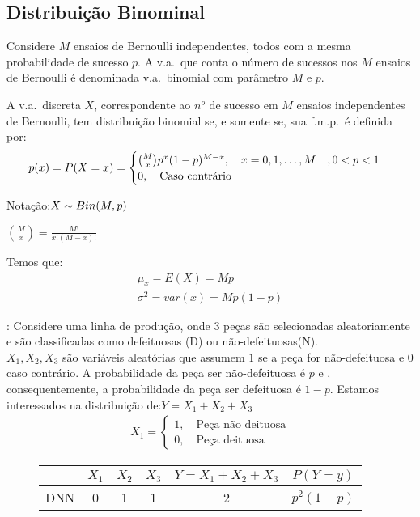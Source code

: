  \subsection{Distribuição Binominal}

 \begin{description}
   \item  Considere $M$ ensaios de Bernoulli independentes, todos com a mesma probabilidade
 de sucesso $p$. A v.a.\ que conta o número de sucessos nos $M$ ensaios de Bernoulli
 é denominada v.a.\ binomial com parâmetro $M$ e $p$.

   \item[Definição:] A v.a.\ discreta $X$, correspondente ao $n^o$ de sucesso em $M$ ensaios
     independentes de Bernoulli, tem distribuição binomial se, e somente se, sua 
     f.m.p.\ é definida por: 
     \begin{align}
       p(x)=P(X=x)=\begin{cases}
         \binom{M}{x}p^x (1-p)^{M-x}, \text{\quad}x=0,1,\dots,M  \quad  ,0<p<1\\
         0, \text{\quad Caso contrário}
       \end{cases}
     \end{align}

   \item{Notação}:$ X \sim Bin(M,p)\\$
   \item     [Obs:] $\binom{M}{x}=\frac{M!}{x!(M-x)!}$

     Temos que: 
     \begin{align}
       \mu_{x}=E(X)=Mp \\
       \sigma^2 =var(x)=Mp(1-p)
     \end{align}
   \item[Exemplo]: Considere uma linha de produção, onde 3 peças são selecionadas aleatoriamente
     e são classificadas como defeituosas (D) ou não-defeituosas(N).\\
     $X_{1},X_{2},X_{3}$ são variáveis aleatórias que assumem $1$ se a peça for não-defeituosa e $0$ caso 
     contrário. A probabilidade da peça ser não-defeituosa é $p$ e , consequentemente, 
     a probabilidade da peça ser defeituosa é $1-p$. Estamos interessados na distribuição
     de:$Y=X_{1}+X_{2}+X_{3}$
     \begin{align*}
       X_1 = \begin{cases}
         1, \quad \text{Peça não deituosa}\\
         0, \quad \text{Peça deituosa}
       \end{cases}
     \end{align*}
     \begin{figure}[H]
       \centering
       
       \label{fig:}
     \end{figure}
     \begin{figure}[H]
     \begin{tabular}{c c c c c c }
       \toprule
       & $X_1$  & $X_2$ & $X_3$   & $Y= X_1 +X_2+ X_3$ & $ P(Y=y)$\\ \midrule
       DNN &0 & 1 & 1 & 2 & $p^2(1-p)$\\\midrule


\end{tabular}
\end{figure}
\end{description}
